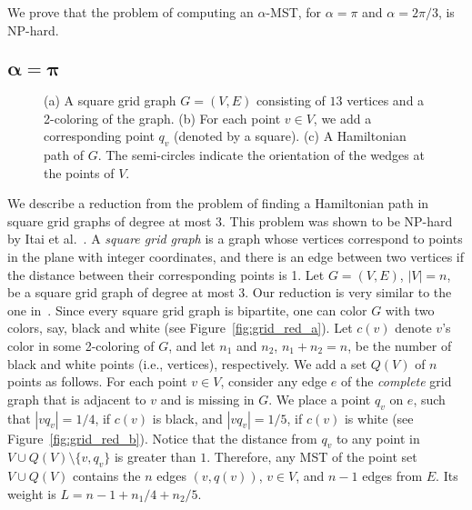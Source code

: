\documentclass[11pt]{article}
\begin{document}
We prove that the problem of computing an $\alpha$-MST, for $\alpha=\pi$ and $\alpha=2\pi/3$, is NP-hard.

\subsection{$\boldsymbol{\alpha=\pi}$}

\begin{figure}[htb]
\centering
  \hspace{.75cm}
  \hspace{.75cm}
 	\caption{(a) A square grid graph $G=(V,E)$ consisting of $13$ vertices and a 2-coloring of the graph. (b) For each point $v \in V$, we add a corresponding point $q_v$ (denoted by a square). (c) A Hamiltonian path of $G$. The semi-circles indicate the orientation of the wedges at the points of $V$.}
 	\label{fig:reduction180}	
\end{figure} 

We describe a reduction from the problem of finding a Hamiltonian path in square grid graphs of degree at most 3. This problem was shown to be NP-hard by Itai et al.~\cite{IPS82}.
A {\em square grid graph} is a graph whose vertices correspond to points in the plane with integer coordinates, and there is an edge between two vertices if the distance between their corresponding points is 1. 
Let $G=(V,E)$, $|V|=n$, be a square grid graph of degree at most 3. Our reduction is very similar to the one in~\cite{PV84}. Since every square grid graph is bipartite, one can color $G$ with two colors, say, black and white (see Figure~\ref{fig:grid_red_a}). Let $c(v)$ denote $v$'s color in some 2-coloring of $G$, and let $n_1$ and $n_2$, $n_1+n_2=n$, be the number of black and white points (i.e., vertices), respectively. 
We add a set $Q(V)$ of $n$ points as follows. For each point $v \in V$, consider any edge $e$ of the {\em complete} grid graph that is adjacent to $v$ and is missing in $G$. We place a point $q_v$ on $e$, such that $|vq_v|=1/4$, if $c(v)$ is black, and $|vq_v|=1/5$, if $c(v)$ is white (see Figure~\ref{fig:grid_red_b}). Notice that the distance from $q_v$ to any point in $V \cup Q(V) \setminus \{v,q_v\}$ is greater than $1$. 
Therefore, any MST of the point set $V \cup Q(V)$ contains the $n$ edges $(v,q(v))$, $v \in V$, and $n-1$ edges from $E$. Its weight is $L = n-1 + n_1/4 + n_2/5$.
\end{document}
